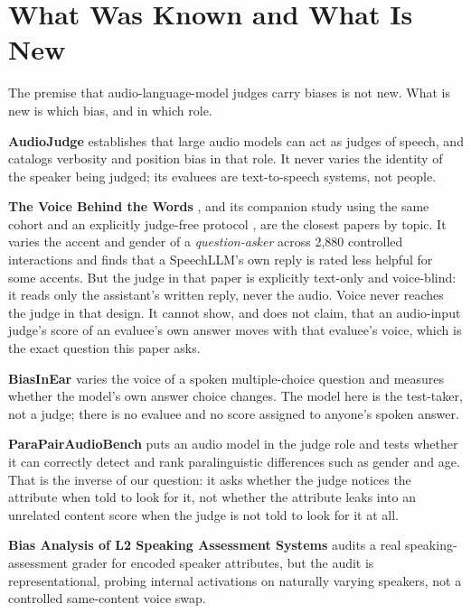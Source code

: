 \documentclass[10pt,twocolumn]{article}
\begin{document}
\section{What Was Known and What Is New}

The premise that audio-language-model judges carry biases is not new. What
is new is which bias, and in which role.

\textbf{AudioJudge} \citep{manakul2025audiojudgeun} establishes that
large audio models can act as judges of speech, and catalogs verbosity and
position bias in that role. It never varies the identity of the speaker
being judged; its evaluees are text-to-speech systems, not people.

\textbf{The Voice Behind the Words} \citep{satish2026thevoicebehi}, and its
companion study using the same cohort and an explicitly judge-free protocol
\citep{satish2026fromseeingit}, are the closest papers by topic. It varies the accent and gender of a
\emph{question-asker} across 2,880 controlled interactions and finds that a
SpeechLLM's own reply is rated less helpful for some accents. But the judge
in that paper is explicitly text-only and voice-blind: it reads only the
assistant's written reply, never the audio. Voice never reaches the judge in
that design. It cannot show, and does not claim, that an audio-input judge's
score of an evaluee's own answer moves with that evaluee's voice, which is
the exact question this paper asks.

\textbf{BiasInEar} \citep{wei2026biasintheear} varies the voice of a spoken
multiple-choice question and measures whether the model's own answer choice
changes. The model here is the test-taker, not a judge; there is no evaluee
and no score assigned to anyone's spoken answer.

\textbf{ParaPairAudioBench} \citep{jeon2026parapairaudi} puts an audio
model in the judge role and tests whether it can correctly detect and rank
paralinguistic differences such as gender and age. That is the inverse of
our question: it asks whether the judge notices the attribute when told to
look for it, not whether the attribute leaks into an unrelated content
score when the judge is not told to look for it at all.

\textbf{Bias Analysis of L2 Speaking Assessment Systems}
\citep{labroo2026biasanalysis} audits a real speaking-assessment grader for
encoded speaker attributes, but the audit is representational, probing
internal activations on naturally varying speakers, not a controlled
same-content voice swap.
\end{document}
